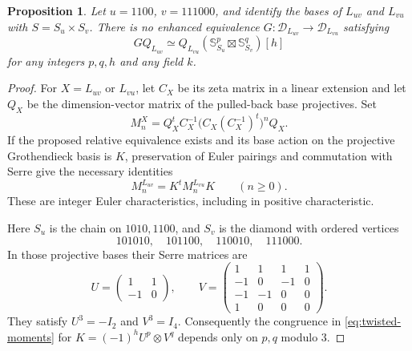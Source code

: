 \documentclass[11pt]{article}
\newtheorem{proposition}[theorem]{Proposition}
\theoremstyle{definition}
\begin{document}
\begin{proposition}\label{prop:factor-serre-obstruction}
Let $u=1100$, $v=111000$, and identify the bases of $L_{uv}$ and
$L_{vu}$ with $S=S_u\times S_v$. There is no enhanced equivalence
$G:\mathcal D_{L_{uv}}\to\mathcal D_{L_{vu}}$ satisfying
\[
 GQ_{L_{uv}}\simeq Q_{L_{vu}}
       (\mathbb S_{S_u}^{p}\boxtimes\mathbb S_{S_v}^{q})[h]
\]
for any integers $p,q,h$ and any field $k$.
\end{proposition}
\begin{proof}
For $X=L_{uv}$ or $L_{vu}$, let $C_X$ be its zeta matrix in a
linear extension and let $Q_X$ be the dimension-vector matrix of
the pulled-back base projectives. Set
\[
 M_n^X=Q_X^t C_X^{-1}
             \bigl(C_X(C_X^{-1})^t\bigr)^n Q_X.
\]
If the proposed relative equivalence exists and its base action
on the projective Grothendieck basis is $K$, preservation of Euler
pairings and commutation with Serre give the necessary identities
\begin{equation}\label{eq:twisted-moments}
 M_n^{L_{uv}}=K^tM_n^{L_{vu}}K\qquad(n\geq0).
\end{equation}
These are integer Euler characteristics, including in positive
characteristic.

Here $S_u$ is the chain on $1010,1100$, and $S_v$ is the diamond
with ordered vertices
\[
 101010,\quad 101100,\quad 110010,\quad 111000.
\]
In those
projective bases their Serre matrices are
\[
 U=\begin{pmatrix}1&1\\-1&0\end{pmatrix},\qquad
 V=\begin{pmatrix}
 1&1&1&1\\-1&0&-1&0\\-1&-1&0&0\\1&0&0&0
 \end{pmatrix}.
\]
They satisfy $U^3=-I_2$ and $V^3=I_4$. Consequently the congruence
in \eqref{eq:twisted-moments} for
$K=(-1)^h U^p\otimes V^q$ depends only on $p,q$ modulo $3$.


\end{proof}
\end{document}
